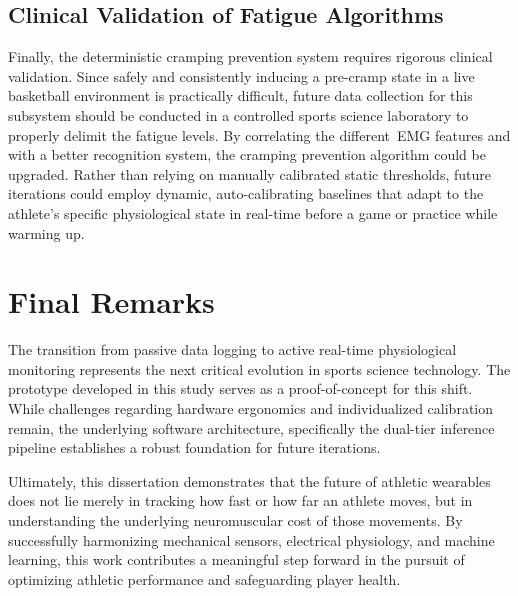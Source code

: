 \subsection{Clinical Validation of Fatigue Algorithms}
\label{sec:future_cramp}
Finally, the deterministic cramping prevention system requires rigorous clinical validation. Since safely and consistently inducing a pre-cramp state in a live basketball environment is practically difficult, 
future data collection for this subsystem should be conducted in a controlled sports science laboratory to properly delimit the fatigue levels. By correlating the different~\gls{EMG} features and with a better recognition 
system, the cramping prevention algorithm could be upgraded. Rather than relying on manually calibrated static thresholds, future iterations could employ dynamic, auto-calibrating 
baselines that adapt to the athlete's specific physiological state in real-time before a game or practice while warming up.


\section{Final Remarks}
\label{sec:final_remarks}
The transition from passive data logging to active real-time physiological monitoring represents the next critical evolution in sports science technology. The prototype developed in this study serves as a 
 proof-of-concept for this shift. While challenges regarding hardware ergonomics and individualized calibration remain, the underlying software architecture, specifically the dual-tier inference pipeline 
 establishes a robust foundation for future iterations.

Ultimately, this dissertation demonstrates that the future of athletic wearables does not lie merely in tracking how fast or how far an athlete moves, but in understanding the underlying neuromuscular cost of those 
movements. By successfully harmonizing mechanical sensors, electrical physiology, and machine learning, this work contributes a meaningful step forward in the pursuit of optimizing athletic performance 
and safeguarding player health.
